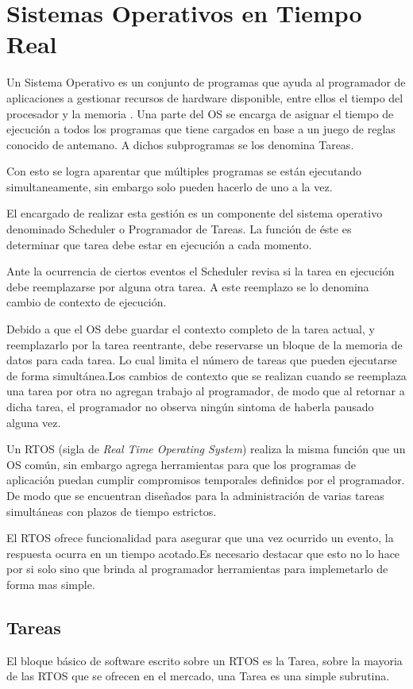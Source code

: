 \documentclass[12pt,letterpaper]{article}
\begin{document}
\section{Sistemas Operativos en Tiempo Real}
Un Sistema Operativo es un conjunto de programas que ayuda al programador de aplicaciones a gestionar recursos de hardware disponible, entre ellos el tiempo del procesador y la memoria \cite{sase2011}.
Una parte del OS se encarga de asignar el tiempo de ejecución a todos los programas que tiene cargados en base a un juego de reglas conocido de antemano. A dichos subprogramas se los denomina Tareas.

Con esto se logra aparentar que múltiples programas se están ejecutando simultaneamente, sin embargo solo pueden hacerlo de uno a la vez.

El encargado de realizar esta gestión es un componente del sistema operativo denominado Scheduler o Programador de Tareas. La función de éste es determinar que tarea debe estar en ejecución a cada momento.

Ante la ocurrencia de ciertos eventos el Scheduler revisa si la tarea en ejecución debe reemplazarse por alguna otra tarea. A este reemplazo se lo denomina cambio de contexto de ejecución.

Debido a que el OS debe guardar el contexto completo de la tarea actual, y reemplazarlo por la tarea reentrante, debe reservarse un bloque de la memoria de datos para cada tarea. Lo cual limita el número de tareas que pueden ejecutarse de forma simultánea.Los cambios de contexto que se realizan cuando se reemplaza una tarea por otra no agregan trabajo al programador, de modo que al retornar a dicha tarea, el programador no observa ningún sintoma de haberla pausado alguna vez.

Un RTOS (sigla de \textit{Real Time Operating System}) realiza la misma función que un OS común, sin embargo agrega herramientas para que los programas de aplicación puedan cumplir compromisos temporales definidos por el programador. De modo que se encuentran diseñados para la administración de varias tareas simultáneas con plazos de tiempo estrictos.

El RTOS ofrece funcionalidad para asegurar que una vez ocurrido un evento, la respuesta ocurra en un tiempo acotado.Es necesario destacar que esto no lo hace por si solo sino que brinda al programador herramientas para implemetarlo de forma mas simple.

\subsection{Tareas}\label{sec:tareas}
El bloque básico de software escrito sobre un RTOS es la Tarea, sobre la mayoria de las RTOS que se ofrecen en el mercado, una Tarea es una simple subrutina\cite{librodertoseningles}.
\end{document}
